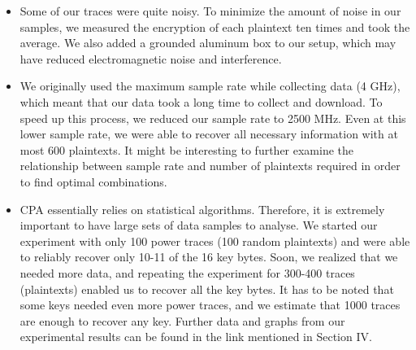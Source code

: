\documentclass[journal]{ieee_style}
\begin{document}
\begin{itemize}
\item Some of our traces were quite noisy. To minimize the amount of noise in our samples, we measured the encryption of each plaintext ten times and took the average. We also added a grounded aluminum box to our setup, which may have reduced electromagnetic noise and interference.
\item We originally used the maximum sample rate while collecting data (4 GHz), which meant that our data took a long time to collect and download. To speed up this process, we reduced our sample rate to 2500 MHz. Even at this lower sample rate, we were able to recover all necessary information with at most 600 plaintexts. It might be interesting to further examine the relationship between sample rate and number of plaintexts required in order to find optimal combinations.
\item CPA essentially relies on statistical algorithms. Therefore, it is extremely important to have large sets of data samples to analyse. We started our experiment with only 100 power traces (100 random plaintexts) and were able to reliably recover only 10-11 of the 16 key bytes. Soon, we realized that we needed more data, and repeating the experiment for 300-400 traces (plaintexts) enabled us to recover all the key bytes. It has to be noted that some keys needed even more power traces, and we estimate that 1000 traces are enough to recover any key. Further data and graphs from our experimental results can be found in the link mentioned in Section IV.
\end{itemize}
\end{document}
